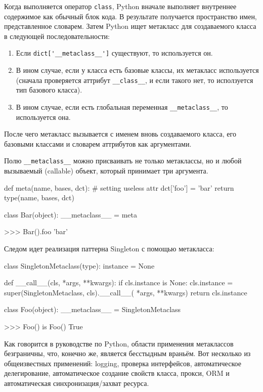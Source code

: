 Когда выполняется оператор \lstinline{class}, Python вначале выполняет внутреннее содержимое как обычный блок кода. В результате получается пространство имен, представленное словарем. Затем Python ищет метакласс для создаваемого класса в следующей последовательности:
\begin{enumerate}
  \item Если \lstinline{dict['__metaclass__']} существуют, то используется он.
  \item В ином случае, если у класса есть базовые классы, их метакласс используется (сначала проверяется аттрибут \lstinline{__class__}, и если такого нет, то исползуется тип базового класса).
  \item В ином случае, если есть глобальная переменная \lstinline{__metaclass__}, то используется она.
\end{enumerate}

После чего метакласс вызывается с именем вновь создаваемого класса, его базовыми классами и словарем аттрибутов как аргументами.

Полю \lstinline{__metaclass__} можно присваивать не только метаклассы, но и любой вызываемый (callable) объект, который принимает три аргумента.
\begin{pylst}{}{}
def meta(name, bases, dct):
    # setting useless attr
    dct['foo'] = 'bar'
    return type(name, bases, dct)

class Bar(object):
    __metaclass__ = meta

>>> Bar().foo
'bar'
\end{pylst}

Следом идет реализация паттерна Singleton с помощью метакласса:
\begin{pylst}{}{}
class SingletonMetaclass(type):
    instance = None

    def __call__(cls, *args, **kwargs):
        if cls.instance is None:
            cls.instance = super(SingletonMetaclass, cls).__call__(
                *args, **kwargs)
        return cls.instance

class Foo(object):
     __metaclass__ = SingletonMetaclass

>>> Foo() is Foo()
True
\end{pylst}

Как говорится в руководстве по Python, области применения метаклассов безграничны, что, конечно же, является бесстыдным враньём. Вот несколько из общеизвестных применений: logging, проверка интерфейсов, автоматическое делегирование, автоматическое создание свойств класса, прокси, ORM и автоматическая синхронизация/захват ресурса.

